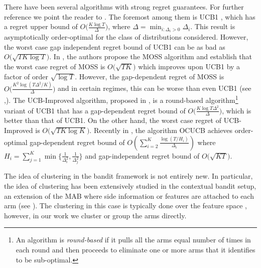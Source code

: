 	There have been several algorithms with strong regret guarantees. For further reference we point the reader to \citet{bubeck2012bandits}. The foremost among them is UCB1 \cite{auer2002finite}, which has a regret upper bound of $O\big(\frac{K\log T}{\Delta}\big)$, where $\Delta = \min_{i:\Delta_i>0} \Delta_i$. This result is asymptotically order-optimal for the class of distributions considered. However, the worst case gap independent regret bound of UCB1  can be as bad as $O \big(\sqrt{TK\log T}\big)$.  In \citet{audibert2009minimax}, the authors propose the MOSS algorithm and establish that the worst case regret of MOSS is $O\big(\sqrt{TK}\big)$ which improves upon UCB1 by a factor of order $\sqrt{\log T}$. However, the gap-dependent regret of MOSS is  $O\big(\frac{K^{2}\log\left(T\Delta^{2}/K\right)}{\Delta}\big)$ and in certain regimes, this can be worse than even UCB1 (see \cite{audibert2009minimax},\cite{lattimore2015optimally}). The UCB-Improved algorithm, proposed in \citet{auer2010ucb}, is a round-based algorithm\footnote{An algorithm is \textit{round-based} if it pulls all the arms equal number of times in each round and then proceeds to eliminate one or more arms that it identifies to be sub-optimal.} variant of UCB1 that 
has a gap-dependent regret bound of $O\big(\frac{K\log T\Delta^{2}}{\Delta}\big)$, which is better than that of UCB1. On the other hand, the worst case regret of UCB-Improved is $O\big(\sqrt{TK\log K}\big)$. Recently in \citet{lattimore2015optimally}, the algorithm OCUCB achieves order-optimal gap-dependent regret bound of $O\left(\sum_{i=2}^{K}\frac{\log\left(T/H_i\right)}{\Delta_i}\right)$ where $H_i=\sum_{j=1}^{K}\min\lbrace \frac{1}{\Delta_i^2},\frac{1}{\Delta_j^2}\rbrace$ and gap-independent regret bound of $O\big( \sqrt{KT}\big)$.

The idea of clustering in the bandit framework is not entirely new. In particular, the idea of clustering has been extensively studied in the contextual bandit setup, an extension of the MAB where side information or features are attached to each arm (see  \citet{auer2002using,langford2008epoch,li2010contextual,beygelzimer2011contextual, slivkins2014contextual}). The clustering in this case is typically done over the feature space \cite{bui2012clustered,cesa2013gang,gentile2014online}, however, in our work we cluster or group the arms directly.  
\vspace*{-0.7em}
